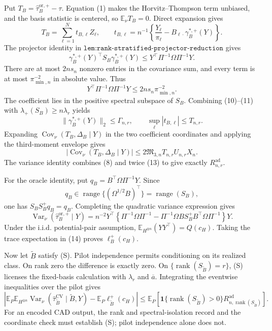 Put \(T_B=\widehat\tau_B^{\mathrm{or},+}-\tau\).  Equation (1) makes the Horvitz--Thompson term unbiased, and the basis statistic is centered, so \(\mathbb E_\nu T_B=0\).  Direct expansion gives
\[
T_B=\sum_{\ell=1}^{N}t_{B,\ell}Z_\ell,
\qquad
t_{B,\ell}=n^{-1}\left\{\frac{Y_\ell}{\pi_\ell}
-B_{\ell\cdot}\gamma_B^{*,+}(Y)\right\}.
\tag{9}
\]
The projector identity in \(\texttt{lem:rank-stratified-projector-reduction}\) gives
\[
\gamma_B^{*,+}(Y)^{\top}S_B\gamma_B^{*,+}(Y)
\le Y^{\top}\Pi^{-1}\Omega\Pi^{-1}Y.
\tag{10}
\]
There are at most \(2ns_n\) nonzero entries in the covariance sum, and every term is at most \(\pi_{\min,n}^{-2}\) in absolute value.  Thus
\[
Y^{\top}\Pi^{-1}\Omega\Pi^{-1}Y
\le2ns_n\pi_{\min,n}^{-2}.
\tag{11}
\]
The coefficient lies in the positive spectral subspace of \(S_B\).  Combining (10)--(11) with \(\lambda_+(S_B)\ge n\lambda_r\) yields
\[
\lVert\gamma_B^{*,+}(Y)\rVert_2\le\Gamma_{n,r},
\qquad
\sup_\ell|t_{B,\ell}|\le T_{n,r}.
\tag{12}
\]
Expanding \(\operatorname{Cov}_\nu(T_B,\Delta_B\mid Y)\) in the two coefficient coordinates and applying the third-moment envelope gives
\[
|\operatorname{Cov}_\nu(T_B,\Delta_B\mid Y)|
\le2\mathfrak M_{3,n}T_{n,r}U_{n,r}X_n.
\tag{13}
\]
The variance identity combines (8) and twice (13) to give exactly \(R_{n,r}^{\mathrm{ad}}\).

For the oracle identity, put \(q_B=B^{\top}\Omega\Pi^{-1}Y\).  Since
\[
q_B\in\operatorname{range}\{(\Omega^{1/2}B)^{\top}\}
=\operatorname{range}(S_B),
\]
one has \(S_BS_B^+q_B=q_B\).  Completing the quadratic variance expression gives
\[
\operatorname{Var}_\nu(\widehat\tau_B^{\mathrm{or},+}\mid Y)
=n^{-2}Y^{\top}\left\{\Pi^{-1}\Omega\Pi^{-1}
-\Pi^{-1}\Omega BS_B^+B^{\top}\Omega\Pi^{-1}\right\}Y.
\tag{14}
\]
Under the i.i.d. potential-pair assumption, \(\mathbb E_{H^{\otimes n}}(YY^{\top})=Q(c_H)\).  Taking the trace expectation in (14) proves \(\ell_B^+(c_H)\).

Now let \(\widetilde B\) satisfy (S).  Pilot independence permits conditioning on its realized class.  On rank zero the difference is exactly zero.  On \(\{\operatorname{rank}(S_{\widetilde B})=r\}\), (S) licenses the fixed-basis calculation with \(\lambda_r\) and \(\overline a\).  Integrating the eventwise inequalities over the pilot gives
\[
\left|\mathbb E_P\mathbb E_{H^{\otimes n}}
\operatorname{Var}_\nu(\widehat\tau_{\widetilde B}^{\mathrm{CV}}\mid\widetilde B,Y)
-\mathbb E_P\ell_{\widetilde B}^+(c_H)\right|
\le\mathbb E_P\!\left[
\mathbf1\{\operatorname{rank}(S_{\widetilde B})>0\}
R_{n,\operatorname{rank}(S_{\widetilde B})}^{\mathrm{ad}}\right].
\tag{15}
\]
For an encoded CAD output, the rank and spectral-isolation record and the coordinate check must establish (S); pilot independence alone does not.

